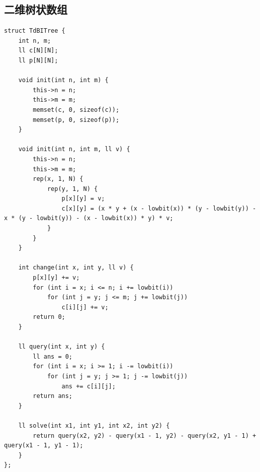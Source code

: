 \documentclass[twoside]{article}
\begin{document}
\subsection{二维树状数组}
\begin{lstlisting}
struct TdBITree {
    int n, m;
    ll c[N][N];
    ll p[N][N];

    void init(int n, int m) {
        this->n = n;
        this->m = m;
        memset(c, 0, sizeof(c));
        memset(p, 0, sizeof(p));
    }

    void init(int n, int m, ll v) {
        this->n = n;
        this->m = m;
        rep(x, 1, N) {
            rep(y, 1, N) {
                p[x][y] = v;
                c[x][y] = (x * y + (x - lowbit(x)) * (y - lowbit(y)) - x * (y - lowbit(y)) - (x - lowbit(x)) * y) * v;
            }
        }
    }

    int change(int x, int y, ll v) {
        p[x][y] += v;
        for (int i = x; i <= n; i += lowbit(i))
            for (int j = y; j <= m; j += lowbit(j))
                c[i][j] += v;
        return 0;
    }

    ll query(int x, int y) {
        ll ans = 0;
        for (int i = x; i >= 1; i -= lowbit(i))
            for (int j = y; j >= 1; j -= lowbit(j))
                ans += c[i][j];
        return ans;
    }

    ll solve(int x1, int y1, int x2, int y2) {
        return query(x2, y2) - query(x1 - 1, y2) - query(x2, y1 - 1) + query(x1 - 1, y1 - 1);
    }
};
\end{lstlisting}
\end{document}
